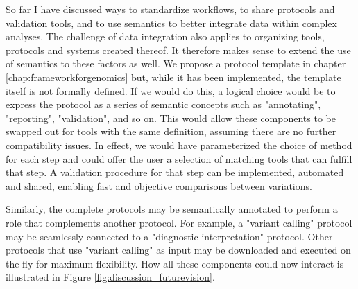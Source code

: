 So far I have discussed ways to standardize workflows, to share protocols and validation tools, and to use semantics to better integrate data within complex analyses.
The challenge of data integration also applies to organizing tools, protocols and systems created thereof.
It therefore makes sense to extend the use of semantics to these factors as well.
We propose a protocol template in chapter \ref{chap:frameworkforgenomics} but, while it has been implemented, the template itself is not formally defined.
If we would do this, a logical choice would be to express the protocol as a series of semantic concepts such as "annotating", "reporting", "validation", and so on.
This would allow these components to be swapped out for tools with the same definition, assuming there are no further compatibility issues.
In effect, we would have parameterized the choice of method for each step and could offer the user a selection of matching tools that can fulfill that step.
A validation procedure for that step can be implemented, automated and shared, enabling fast and objective comparisons between variations.

Similarly, the complete protocols may be semantically annotated to perform a role that complements another protocol.
For example, a "variant calling" protocol may be seamlessly connected to a "diagnostic interpretation" protocol.
Other protocols that use "variant calling" as input may be downloaded and executed on the fly for maximum flexibility.
How all these components could now interact is illustrated in Figure \ref{fig:discussion_futurevision}.

